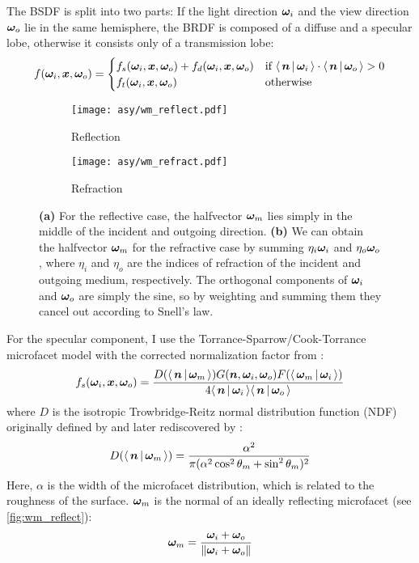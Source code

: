 The BSDF is split into two parts: If the light direction ${\bm{\omega}_i}$ and the view direction ${\bm{\omega}_o}$ lie in the same hemisphere, the BRDF is composed of a diffuse and a specular lobe, otherwise it consists only of a transmission lobe:
\begin{equation}
    f(\wi, \vec{x}, \wo) =
    \begin{cases}
        f_s(\wi, \vec{x}, \wo) + f_d(\wi, \vec{x}, \wo) & \text{if } \NdotL \cdot \NdotV > 0 \\
        f_t(\wi, \vec{x}, \wo) & \text{otherwise}
    \end{cases}
\end{equation}

\begin{figure}
\begin{subfigure}{.5\textwidth}
    \centering
    \texttt{[image: asy/wm\_reflect.pdf]}
    \caption{Reflection}
    \label{fig:wm_reflect}
\end{subfigure}%
\begin{subfigure}{.5\textwidth}
    \centering
    \texttt{[image: asy/wm\_refract.pdf]}
    \caption{Refraction}
    \label{fig:wm_refract}
\end{subfigure}
\caption{
\textbf{(a)} For the reflective case, the halfvector $\bm{\omega}_m$ lies simply in the middle of the incident and outgoing direction.
\textbf{(b)} We can obtain the halfvector $\bm{\omega}_m$ for the refractive case by summing $\eta_i {\bm{\omega}_i}$ and $\eta_o {\bm{\omega}_o}$, where $\eta_i$ and $\eta_o$ are the indices of refraction of the incident and outgoing medium, respectively. The orthogonal components of ${\bm{\omega}_i}$ and ${\bm{\omega}_o}$ are simply the sine, so by weighting and summing them they cancel out according to Snell's law.
}
\end{figure}

For the specular component, I use the Torrance-Sparrow/Cook-Torrance microfacet model \parencite{torrance1967, cook1982} with the corrected normalization factor from \textcite{walter2007}:
\begin{equation}
    f_s(\wi, \vec{x}, \wo) = \frac{D(\NdotH) G(\n, \wi, \wo) F(\LdotH)}{4 \NdotL \NdotV}
\end{equation}
where $D$ is the isotropic Trowbridge-Reitz normal distribution function (NDF) originally defined by \textcite{trowbridge1975} and later rediscovered by \textcite{walter2007}:
\begin{equation}
    D(\NdotH) = \frac{\alpha^2}{\pi (\alpha^2 \cos^2 \theta_m + \sin^2 \theta_m)^2}
\end{equation}
Here, $\alpha$ is the width of the microfacet distribution, which is related to the roughness of the surface.
$\bm{\omega}_m$ is the normal of an ideally reflecting microfacet (see \autoref{fig:wm_reflect}):
\begin{equation}
    \bm{\omega}_m = \frac{{\bm{\omega}_i} + {\bm{\omega}_o}}{\|{\bm{\omega}_i} + {\bm{\omega}_o}\|}
\end{equation}

